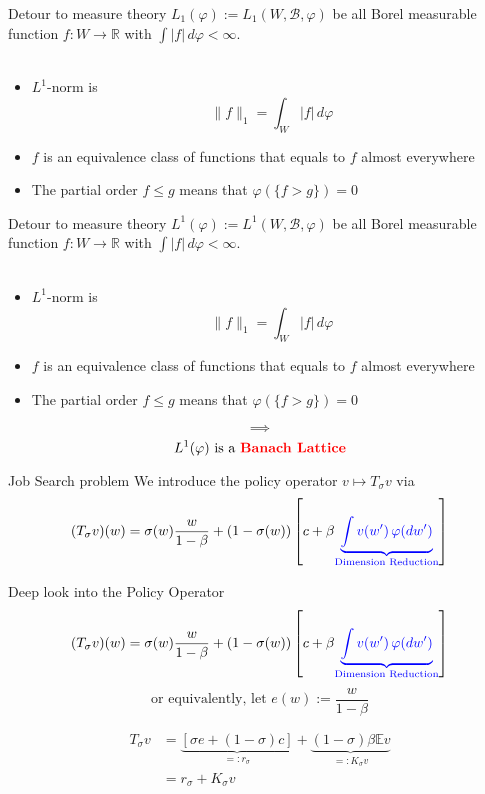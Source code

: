 \documentclass[aspectratio=169]{beamer} %
\begin{document}
\begin{frame}{Detour to measure theory}
$L_1(\varphi):= L_1(W,\mathcal{B}, \varphi)$ be all Borel measurable function $f:W\to \mathbb{R}$ with $\int|f|\,d\varphi<\infty$.\\
\\
\begin{itemize}
    \item $L^1$-norm is
    $$
    \|f\|_1 = \int_W |f|\, d\varphi
    $$
    \item $f$ is an equivalence class of functions that equals to $f$ almost everywhere
    \item The partial order $f\le g$ means that $\varphi(\{f>g\})=0$
\end{itemize}
\end{frame}


\begin{frame}{Detour to measure theory}
$L^1(\varphi):= L^1(W,\mathscr{B}, \varphi)$ be all Borel measurable function $f:W\to \mathbb{R}$ with $\int|f|\,d\varphi<\infty$.\\
\\
\begin{itemize}
    \item $L^1$-norm is
    $$
    \|f\|_1 = \int_W |f|\, d\varphi
    $$
    \item $f$ is an equivalence class of functions that equals to $f$ almost everywhere
    \item The partial order $f\le g$ means that $\varphi(\{f>g\})=0$
\end{itemize}
$$
\implies
$$
$$
\text{$L^1(\varphi)$ is a \textcolor{red}{\textbf{Banach Lattice}}}
$$
\end{frame}

\begin{frame}{Job Search problem}
We introduce the policy operator $v\mapsto T_\sigma v$ via
$$
(T_\sigma v)(w) = \sigma(w) \frac{w}{1-\beta} + (1-\sigma(w))\left[c+\beta\textcolor{blue}{\underbrace{\int v(w')\, \varphi(dw')}_{\text{Dimension Reduction}}}\right]
$$
    
\end{frame}

\begin{frame}{Deep look into the Policy Operator}
        $$
(T_\sigma v)(w) = \sigma(w) \frac{w}{1-\beta} + (1-\sigma(w))\left[c+\beta\textcolor{blue}{\underbrace{\int v(w')\, \varphi(dw')}_{\text{Dimension Reduction}}}\right]
$$
$$
\text{or equivalently, let $e(w):=\frac{w}{1-\beta}$}
$$

\begin{align*}
    T_\sigma v &= \underbrace{[\sigma e+(1-\sigma)c]}_{=:r_\sigma} + \underbrace{(1-\sigma)\beta \mathbb{E}v}_{=:K_\sigma v}\\
    &= r_\sigma + K_\sigma v
\end{align*}
\end{frame}
\end{document}
